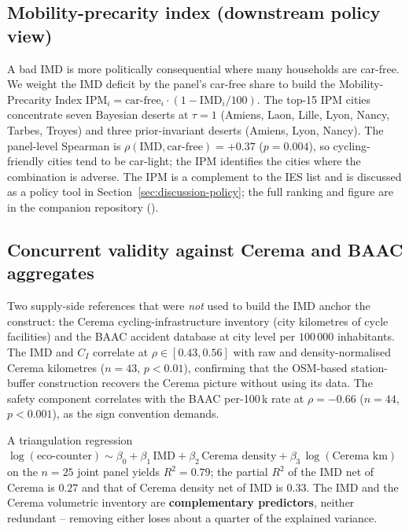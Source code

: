 \documentclass[11pt,a4paper]{article}
\newcommand{\IMD}{\mathrm{IMD}}
\begin{document}
\subsection{Mobility-precarity index (downstream policy view)}
\label{sec:val-precarity}

A bad IMD is more politically consequential where many
households are car-free. We weight the IMD deficit by the
panel's car-free share to build the Mobility-Precarity Index
$\mathrm{IPM}_i = \mathrm{car\text{-}free}_i \cdot (1 - \IMD_i /
100)$. The top-15 IPM cities concentrate seven Bayesian deserts
at $\tau = 1$ (Amiens, Laon, Lille, Lyon, Nancy, Tarbes, Troyes)
and three prior-invariant deserts (Amiens, Lyon, Nancy). The
panel-level Spearman is $\rho(\IMD, \text{car-free}) = +0.37$
($p = 0.004$), so cycling-friendly cities tend to be car-light;
the IPM identifies the cities where the combination is adverse.
The IPM is a complement to the IES list and is discussed as a
policy tool in Section~\ref{sec:discussion-policy}; the full
ranking and figure are in the companion repository
().

\subsection{Concurrent validity against Cerema and BAAC aggregates}
\label{sec:val-cerema}

Two supply-side references that were \emph{not} used to build the
IMD anchor the construct: the Cerema cycling-infrastructure
inventory (city kilometres of cycle facilities) and the BAAC
accident database at city level per $100\,000$ inhabitants. The
IMD and $C_I$ correlate at $\rho \in [0.43, 0.56]$ with raw and
density-normalised Cerema kilometres ($n = 43$, $p < 0.01$),
confirming that the OSM-based station-buffer construction
recovers the Cerema picture without using its data. The safety
component correlates with the BAAC per-100\,k rate at $\rho =
-0.66$ ($n = 44$, $p < 0.001$), as the sign convention demands.

A triangulation regression $\log(\text{eco-counter}) \sim
\beta_0 + \beta_1\,\IMD + \beta_2\,\text{Cerema density} +
\beta_3\,\log(\text{Cerema km})$ on the $n = 25$ joint panel
yields $R^{2} = 0.79$; the partial $R^{2}$ of the IMD net of
Cerema is $0.27$ and that of Cerema density net of IMD is
$0.33$. The IMD and the Cerema volumetric inventory are
\textbf{complementary predictors}, neither redundant -- removing
either loses about a quarter of the explained variance.
\end{document}
